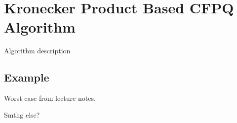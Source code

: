 \section{Kronecker Product Based CFPQ Algorithm}

Algorithm description

\subsection{Example}

Worst case from lecture notes.

Smthg else? 
